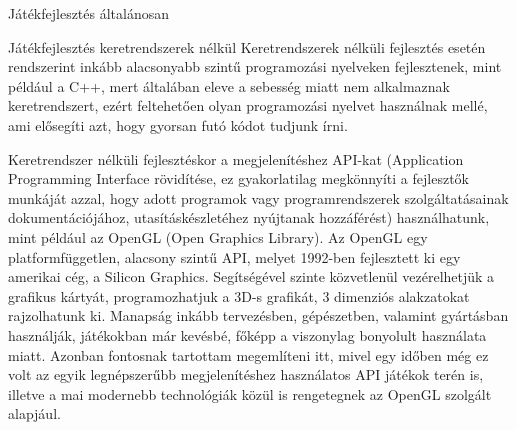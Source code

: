 \begin{MyChapter}{Játékfejlesztés általánosan}
	\begin{MySection}{Játékfejlesztés keretrendszerek nélkül}
		Keretrendszerek nélküli fejlesztés esetén rendszerint inkább alacsonyabb szintű programozási nyelveken fejlesztenek, mint például a C++, mert általában eleve a sebesség miatt nem alkalmaznak keretrendszert, ezért feltehetően olyan programozási nyelvet használnak mellé, ami elősegíti azt, hogy gyorsan futó kódot tudjunk írni.
		
		Keretrendszer nélküli fejlesztéskor a megjelenítéshez API-kat (Application Programming Interface rövidítése, ez gyakorlatilag megkönnyíti a fejlesztők munkáját azzal, hogy adott programok vagy programrendszerek szolgáltatásainak dokumentációjához, utasításkészletéhez nyújtanak hozzáférést) használhatunk, mint például az OpenGL (Open Graphics Library). Az OpenGL egy platformfüggetlen, alacsony szintű API, melyet 1992-ben fejlesztett ki egy amerikai cég, a Silicon Graphics. Segítségével szinte közvetlenül vezérelhetjük a grafikus kártyát, programozhatjuk a 3D-s grafikát, 3 dimenziós alakzatokat rajzolhatunk ki. 
		Manapság inkább tervezésben, gépészetben, valamint gyártásban használják, játékokban már kevésbé, főképp a viszonylag bonyolult használata miatt. Azonban fontosnak tartottam megemlíteni itt, mivel egy időben még ez volt az egyik legnépszerűbb megjelenítéshez használatos API játékok terén is, illetve a mai modernebb technológiák közül is rengetegnek az OpenGL szolgált alapjául.
		

\end{MySection}
\end{MyChapter}
